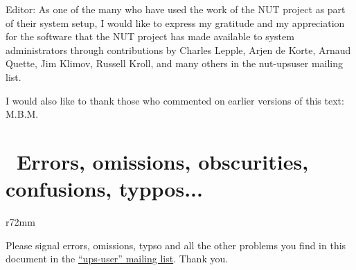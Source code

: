 \documentclass[12pt]{article}
\newlength{\headersep}\setlength{\headersep}{3mm}
\newcommand{\Hsep}{\hspace{\headersep}}
\newcommand{\mailinglist}{\href{https://lists.alioth.debian.org/mailman/listinfo/nut-upsuser}%
                               {``ups-user'' mailing list}}
\begin{document}
Editor: As one of the many who have used the work of the NUT project as part
of their system setup, I would like to express my gratitude and my
appreciation for the software that the NUT project has made available to
system administrators through contributions by Charles Lepple, Arjen de Korte,
Arnaud Quette, Jim Klimov, Russell Kroll, and many others in the nut-upsuser
mailing list.

I would also like to thank those who commented on earlier versions of this
text: M.B.M.

\vspace*{\fill}

\begin{center}
\end{center}

\vspace*{\fill}



\section{\Hsep\ Errors, omissions, obscurities, confusions, typpos...}\label{bugs}

\begin{wrapfigure}[6]{r}{72mm}
\vspace{-3.5mm}
\end{wrapfigure}

Please signal errors, omissions, typso and all the other problems you find in
this document in the \mailinglist.  Thank you.

\vspace{10mm}
\hspace{30mm}

\vspace*{\fill}

\label{LastPage}
\end{document}
